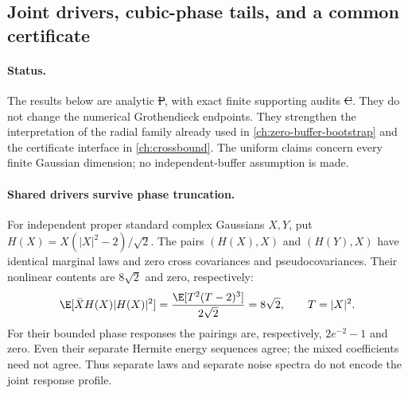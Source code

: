 \subsection{Joint drivers, cubic-phase tails, and a common certificate}
\label{sec:joint-structure-progress-20261022}

\paragraph{Status.}
The results below are analytic \st{P}, with exact finite supporting
audits \st{C}. They do not change the numerical Grothendieck endpoints.
They strengthen the interpretation of the radial family already used in
\autoref{ch:zero-buffer-bootstrap} and the certificate interface in
\autoref{ch:crossbound}. The uniform claims concern every finite Gaussian
dimension; no independent-buffer assumption is made.

\paragraph{Shared drivers survive phase truncation.}
For independent proper standard complex Gaussians $X,Y$, put
$H(X)=X(|X|^2-2)/\sqrt2$. The pairs $(H(X),X)$ and $(H(Y),X)$ have
identical marginal laws and zero cross covariances and pseudocovariances.
Their nonlinear contents are $8\sqrt2$ and zero, respectively:
\[
 \E[\bar XH(X)|H(X)|^2]
 =\frac{\E[T^2(T-2)^3]}{2\sqrt2}=8\sqrt2,
 \qquad T=|X|^2.
\]
For their bounded phase responses the pairings are, respectively,
$2e^{-2}-1$ and zero. Even their separate Hermite energy sequences agree;
the mixed coefficients need not agree. Thus separate laws and separate
noise spectra do not encode the joint response profile.

